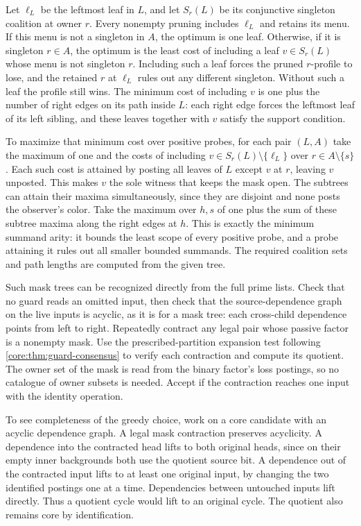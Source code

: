 Let $\ell_L$ be the leftmost leaf in $L$, and let $S_r(L)$
be its conjunctive singleton coalition at owner $r$.
Every nonempty pruning includes $\ell_L$ and retains its
menu. If this menu is not a singleton in $A$, the optimum
is one leaf. Otherwise, if it is singleton $r\in A$, the
optimum is the least cost of including a leaf
$v\in S_r(L)$ whose menu is not singleton $r$. Including
such a leaf forces the pruned $r$-profile to lose, and the
retained $r$ at $\ell_L$ rules out any different singleton.
Without such a leaf the profile still wins. The minimum
cost of including $v$ is one plus the number of right
edges on its path inside $L$: each right edge forces the
leftmost leaf of its left sibling, and these leaves together
with $v$ satisfy the support condition.

To maximize that minimum cost over positive probes, for
each pair $(L,A)$ take the maximum of one and the costs
of including $v\in S_r(L)\setminus\{\ell_L\}$ over
$r\in A\setminus\{s\}$. Each such cost is attained by posting
all leaves of $L$ except $v$ at $r$, leaving $v$ unposted.
This makes $v$ the sole witness that keeps the mask open.
The subtrees can attain their maxima simultaneously, since
they are disjoint and none posts the observer's color.
Take the maximum over $h,s$ of one plus the sum of these
subtree maxima along the right edges at $h$. This is exactly
the minimum summand arity: it bounds the least scope of
every positive probe, and a probe attaining it rules out
all smaller bounded summands. The required coalition sets
and path lengths are computed from the given tree.

Such mask trees can be recognized directly from the full
prime lists. Check that no guard reads an omitted input,
then check that the source-dependence graph on the live
inputs is acyclic, as it is for a mask tree: each
cross-child dependence points from left to right. Repeatedly
contract any legal pair whose passive factor is a nonempty
mask. Use the prescribed-partition expansion test following
\cref{core:thm:guard-consensus} to verify each contraction and
compute its quotient. The owner set of the mask is read
from the binary factor's loss postings, so no catalogue of
owner subsets is needed. Accept if the contraction reaches
one input with the identity operation.

To see completeness of the greedy choice, work on a core
candidate with an acyclic dependence graph. A legal mask
contraction preserves acyclicity. A dependence into the
contracted head lifts to both original heads, since on their
empty inner backgrounds both use the quotient source bit.
A dependence out of the contracted input lifts to at least
one original input, by changing the two identified postings
one at a time. Dependencies between untouched inputs lift
directly. Thus a quotient cycle would lift to an original
cycle. The quotient also remains core by identification.

